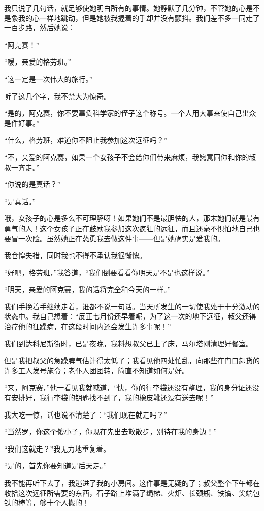 \documentclass[10pt]{book}
\begin{document}
我只说了几句话，就足够使她明白所有的事情。她静默了几分钟，不管她的心是不是象我的心一样地跳动，但是她被我握着的手却并没有颤抖。我们差不多一同走了一百步路，然后她说：

“阿克赛！”

“嗳，亲爱的格劳班。”

“这一定是一次伟大的旅行。”

听了这几个字，我不禁大为惊奇。

“是的，阿克赛，你不要辜负科学家的侄子这个称号。一个人用大事来使自己出众是件好事。”

“什么，格劳班，难道你不阻止我参加这次远征吗？”

“不，亲爱的阿克赛，如果一个女孩子不会给你们带来麻烦，我愿意同你和你的叔叔一齐走。”

“你说的是真话？”

“是真话。”

哦，女孩子的心是多么不可理解呀！如果她们不是最胆怯的人，那末她们就是最有勇气的人！这个女孩子正在鼓励我参加这次疯狂的远征，而且还毫不惧怕地自己也要冒一次险。虽然她正在怂恿我去做这件事——但是她确实是爱我的。

我仓惶失措，同时我也不得不承认我很惭愧。

“好吧，格劳班，”我答道，“我们倒要看看你明天是不是也这样说。”

“明天，亲爱的阿克赛，我的话将完全和今天的一样。”

我们手挽着手继续走着，谁都不说一句话。当天所发生的一切使我处于十分激动的状态中。我自己想着：“反正七月份还早着呢，为了这一次的地下远征，叔父还得治疗他的狂躁病，在这段时间内还会发生许多事呢！”

我们到达科尼斯街时，已是夜晚，我料想叔父已上了床，马尔塔刚清理好餐室。

但是我把叔父的急躁脾气估计得太低了；我看见他四处忙乱，向那些在门口卸货的许多工人发号施令；老仆人团团转，简直不知道如何是好。

“来，阿克赛，”他一看见我就喊道，“快，你的行李袋还没有整理，我的身分证还没有安排好，我行李袋的钥匙找不到了，我的橡皮靴还没有送去呢！”

我大吃一惊，话也说不清楚了：“我们现在就走吗？”

“当然罗，你这个傻小子，你现在先出去散散步，别待在我的身边！”

“我们这就走？”我无力地重复着。

“是的，首先你要知道是后天走。”

我不能再听下去了，我逃进了我的小房间。这件事是无疑的了；叔父整个下午都在收拾这次远征所需要的东西，石子路上堆满了绳梯、火炬、长颈瓶、铁镐、尖端包铁的棒等，够十个人搬的！
\end{document}
